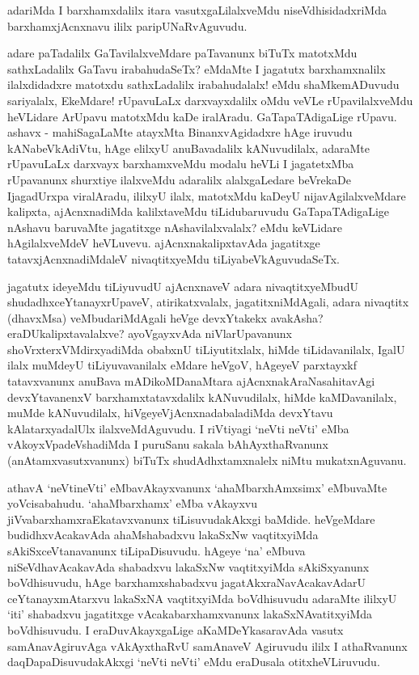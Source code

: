 \begin{artha}
adariMda I barxhamxdalilx itara vasutxgaLilalxveMdu
niseVdhisidadxriMda barxhamxjAcnxnavu ililx paripUNaRvAguvudu. 

adare paTadalilx GaTavilalxveMdare paTavanunx biTuTx matotxMdu
sathxLadalilx GaTavu irabahudaSeTx? eMdaMte I jagatutx barxhamxnalilx
ilalxdidadxre matotxdu sathxLadalilx irabahudalalx! eMdu
shaMkemADuvudu sariyalalx, EkeMdare! rUpavuLaLx darxvayxdalilx oMdu
veVLe rUpavilalxveMdu heVLidare ArUpavu matotxMdu kaDe
iralAradu. GaTapaTAdigaLige rUpavu. ashavx - mahiSagaLaMte atayxMta
BinanxvAgidadxre hAge iruvudu kANabeVkAdiVtu, hAge elilxyU
anuBavadalilx kANuvudilalx, adaraMte rUpavuLaLx darxvayx barxhamxveMdu
modalu heVLi I jagatetxMba rUpavanunx shurxtiye ilalxveMdu adaralilx
alalxgaLedare beVrekaDe IjagadUrxpa viralAradu, ililxyU ilalx,
matotxMdu kaDeyU nijavAgilalxveMdare kalipxta, ajAcnxnadiMda
kalilxtaveMdu tiLidubaruvudu GaTapaTAdigaLige nAshavu baruvaMte
jagatitxge nAshavilalxvalalx? eMdu keVLidare hAgilalxveMdeV
heVLuvevu. ajAcnxnakalipxtavAda jagatitxge tatavxjAcnxnadiMdaleV
nivaqtitxyeMdu tiLiyabeVkAguvudaSeTx.
\end{artha}

\begin{artha}
jagatutx ideyeMdu tiLiyuvudU ajAcnxnaveV adara nivaqtitxyeMbudU
 shudadhxceYtanayxrUpaveV, atirikatxvalalx, jagatitxniMdAgali, adara
nivaqtitx (dhavxMsa) veMbudariMdAgali heVge devxYtakekx avakAsha?
eraDUkalipxtavalalxve? ayoVgayxvAda niVlarUpavanunx
shoVrxterxVMdirxyadiMda obabxnU tiLiyutitxlalx, hiMde
tiLidavanilalx, IgalU ilalx muMdeyU tiLiyuvavanilalx eMdare heVgoV,
hAgeyeV parxtayxkf tatavxvanunx anuBava mADikoMDanaMtara ajAcnxnakAraNasahitavAgi devxYtavanenxV barxhamxtatavxdalilx kANuvudilalx, hiMde
kaMDavanilalx, muMde kANuvudilalx, hiVgeyeVjAcnxnadabaladiMda
devxYtavu kAlatarxyadalUlx ilalxveMdAguvudu. I riVtiyagi `neVti neVti'
eMba vAkoyxVpadeVshadiMda I puruSanu sakala bAhAyxthaRvanunx
(anAtamxvasutxvanunx) biTuTx shudAdhxtamxnalelx niMtu mukatxnAguvanu.
\end{artha}

\begin{center}
\end{center}

\begin{artha}
athavA `neVtineVti' eMbavAkayxvanunx `ahaMbarxhAmxsimx' eMbuvaMte
yoVcisabahudu.  `ahaMbarxhamx' eMba vAkayxvu
jiVvabarxhamxraEkatavxvanunx tiLisuvudakAkxgi baMdide. heVgeMdare
budidhxvAcakavAda ahaMshabadxvu lakaSxNw vaqtitxyiMda
sAkiSxceVtanavanunx tiLipaDisuvudu. hAgeye `na' eMbuva
niSeVdhavAcakavAda shabadxvu lakaSxNw vaqtitxyiMda sAkiSxyanunx
boVdhisuvudu, hAge barxhamxshabadxvu jagatAkxraNavAcakavAdarU
ceYtanayxmAtarxvu lakaSxNA vaqtitxyiMda boVdhisuvudu adaraMte ililxyU
`iti' shabadxvu jagatitxge vAcakabarxhamxvanunx lakaSxNAvatitxyiMda
boVdhisuvudu. I eraDuvAkayxgaLige aKaMDeYkasaravAda vasutx
samAnavAgiruvAga vAkAyxthaRvU samAnaveV Agiruvudu ililx I athaRvanunx
daqDapaDisuvudakAkxgi `neVti neVti' eMdu eraDusala otitxheVLiruvudu.
\end{artha}

